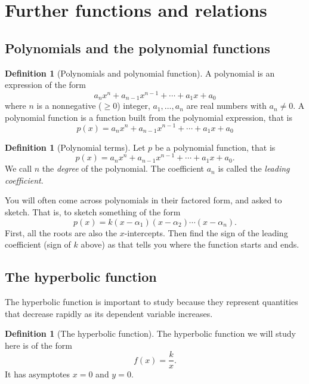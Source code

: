 \documentclass[12pt]{book}
\theoremstyle{definition}
\newtheorem{defi}[theo]{Definition}
\begin{document}
\section{Further functions and relations}
\subsection{Polynomials and the polynomial functions}
  \begin{defi}[Polynomials and polynomial function]
    A polynomial is an expression of the form \[a_nx^n+a_{n-1}x^{n-1}+\cdots+a_1x+a_0\]
    where $n$ is a nonnegative ($\geq 0$) integer, $a_1,\ldots,a_n$ are real numbers with $a_n\neq 0$. A polynomial
    function is a function built from the polynomial expression, that is
    \[p(x)=a_nx^n+a_{n-1}x^{n-1}+\cdots+a_1x+a_0\]
  \end{defi}
  \begin{defi}[Polynomial terms]
     Let $p$ be a polynomial function, that is
    \[p(x)=a_nx^n+a_{n-1}x^{n-1}+\cdots+a_1x+a_0.\]
    We call $n$ the \textit{degree} of the polynomial. The coefficient $a_n$ is called the \textit{leading coefficient}.
  \end{defi}
  You will often come across polynomials in their factored form, and asked to sketch. That is, to sketch something of the form
  \[p(x)=k(x-\alpha_1)(x-\alpha_2)\cdots(x-\alpha_n).\]
  First, all the roots are also the $x$-intercepts. Then find the sign of the leading coefficient (sign of $k$ above) as that tells
  you where the function starts and ends.
\subsection{The hyperbolic function}
  The hyperbolic function is important to study because they represent quantities that decrease rapidly as its dependent variable
  increases.
  \begin{defi}[The hyperbolic function]
    The hyperbolic function we will study here is of the form \[f(x)=\frac{k}{x}.\] It has asymptotes $x=0$ and $y=0$.
  \end{defi}
\end{document}
